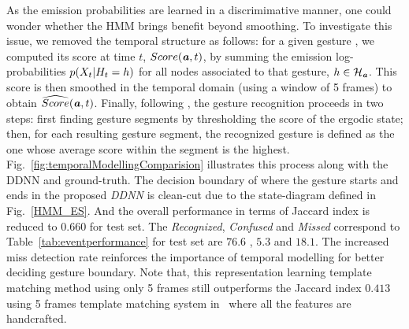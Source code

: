 %
As the emission probabilities are learned in a discrimimative manner, one could  wonder whether the HMM brings benefit beyond smoothing.
To investigate this issue, we removed the temporal structure as follows:
for a given gesture \gesturea, we computed its score at time $t$, $Score(\textbf{\emph{a}},t)$, by summing the emission
log-probabilities $p(X_t|H_t = h)$ for all nodes associated to that gesture,
\ie $h \in \mathcal{H}_{\textbf{\emph{a}}}$.
%
This score is then smoothed in the temporal domain (using a window of 5 frames) to obtain $\widehat{Score}(\textbf{\emph{a}},t)$.
%
Finally, following \cite{neverova2014moddrop}, the gesture recognition proceeds in two steps:
first finding gesture segments by thresholding the score of the ergodic state;
then, for each resulting gesture segment, the recognized gesture is defined as the one whose average score within the segment is the highest.
%
Fig.~\ref{fig:temporalModellingComparision} illustrates this process along with the DDNN and ground-truth.
%
%
The decision boundary of where the gesture starts and ends in the proposed \emph{DDNN} is clean-cut due to the state-diagram defined in Fig.~\ref{HMM_ES}. And the overall performance in terms of  Jaccard index is reduced to $0.660$ for test set.
The \emph{Recognized}, \emph{Confused} and \emph{Missed} correspond to Table~\ref{tab:eventperformance} for test set are  $76.6$ , $5.3$ and $18.1$. The increased miss detection rate reinforces the importance of temporal modelling for better deciding gesture boundary.
 Note that, this representation learning template matching method using only 5 frames still outperforms the Jaccard index $0.413$ using 5 frames template matching system in~\cite{camgoz2014gesture} where all the features are handcrafted.

